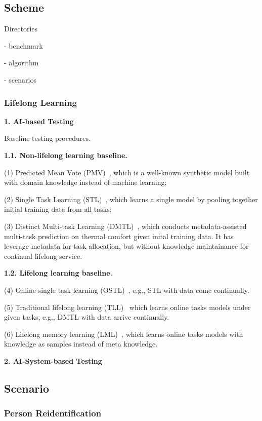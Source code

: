 \subsection{Scheme}

Directories

- benchmark

- algorithm

- scenarios

\noindent \subsubsection{Lifelong Learning}

\textbf{1. AI-based Testing}

Baseline testing procedures. 

\textbf{1.1. Non-lifelong learning baseline.}

(1) Predicted Mean Vote (PMV)~\cite{iso05}, which is a well-known synthetic model built with domain knowledge instead of machine learning; 

(2) Single Task Learning (STL)~\cite{peng17data}, which learns a single model by pooling together initial training data from all tasks; 

(3)
Distinct Multi-task Learning (DMTL)~\cite{yang18}, which conducts metadata-assisted multi-task prediction on thermal comfort given inital training data. It has leverage metadata for task allocation, but without knowledge maintainance for continual lifelong service. 

\textbf{1.2. Lifelong learning baseline.}

(4) Online single task learning (OSTL)~\cite{anderson08theory}, e.g., STL with data come continually. 

(5) Traditional lifelong learning (TLL)~\cite{silver13lifelong} which learns online tasks models under given tasks, e.g., DMTL with data arrive continually. 

(6) Lifelong memory learning (LML)~\cite{altman92introduction}, which learns online tasks models with knowledge as samples instead of meta knowledge.



\noindent \textbf{2. AI-System-based Testing}



\subsection{Scenario}

\subsubsection{Person Reidentification}
